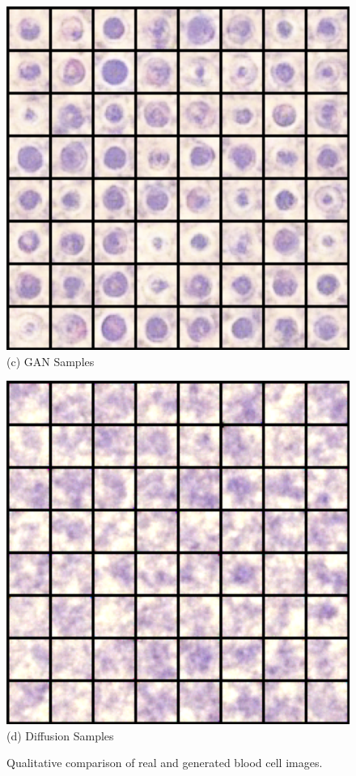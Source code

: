 \begin{figure}
    \vspace{0.5em}

    \begin{minipage}[t]{0.48\textwidth}
        \centering
        \includegraphics[width=\linewidth]{images/gan.png}
        (c) GAN Samples
    \end{minipage}
    \hfill
    \begin{minipage}[t]{0.48\textwidth}
        \centering
        \includegraphics[width=\linewidth]{images/diffusion.png}
        (d) Diffusion Samples
    \end{minipage}

    \caption{Qualitative comparison of real and generated blood cell images.}\label{fig:model-comparison}
\end{figure}

